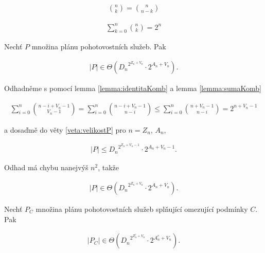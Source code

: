\begin{lemma}\label{lemma:identitaKomb}
  \begin{align*}
    \binom{n}{k} = \binom{n}{n - k}
  \end{align*}
\end{lemma}

\begin{lemma}\label{lemma:sumaKomb}
  \begin{align*}
    \sum_{k=0}^n \binom{n}{k} = 2^n
  \end{align*}
\end{lemma}

\begin{veta}\label{veta:asymptotP}
  Nechť $P$ množina plánu pohotovostních služeb. Pak 

  \begin{align*}
    |P| \in \Theta({D_n}^{2^{Z_n + V_n}} \cdot 2^{A_n + V_n}).
  \end{align*}
\end{veta}

\begin{dukaz}
  Odhadněme s pomocí lemma \ref{lemma:identitaKomb} a lemma \ref{lemma:sumaKomb}

  \begin{align*}
    \sum_{i=0}^{n} \binom{n - i + V_n - 1}{V_n - 1} =
    \sum_{i=0}^{n} \binom{n - i + V_n - 1}{n - i} \leq
    \sum_{i=0}^{n} \binom{n + V_n - 1}{n - i} =
    2^{n + V_n - 1}
  \end{align*}

  a dosaďmě do věty \ref{veta:velikostP} pro $n = Z_n$, $A_n$,

  \begin{align*}
    |P| \leq {D_n}^{2^{Z_n + V_n - 1}} \cdot 2^{A_n + V_n - 1}.
  \end{align*}

  Odhad má chybu nanejvýš $n^2$, takže
  
  \begin{align*}
    |P| \in \Theta({D_n}^{2^{Z_n + V_n}} \cdot 2^{A_n + V_n}).
  \end{align*}
\end{dukaz}

\begin{veta}
  Nechť $P_C$ množina plánu pohotovostních služeb splňující omezující podmínky $C$. Pak 

  \begin{align*}
    |P_C| \in \Theta({D_n}^{2^{Z^c_n + V_n}} \cdot 2^{A^c_n + V_n}).
  \end{align*}
\end{veta}

